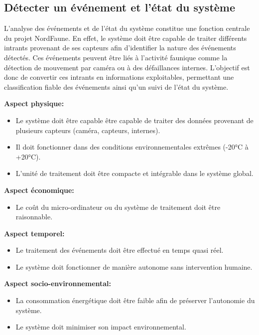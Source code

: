 \subsection{Détecter un événement et l'état du système}
\label{DétecterUnÉnévement}
L’analyse des événements et de l’état du système constitue une fonction centrale du projet NordFaune. En effet, le système doit être capable de traiter différents intrants provenant de ses capteurs afin d’identifier la nature des événements détectés. Ces événements peuvent être liés à l’activité faunique comme la détection de mouvement par caméra ou à des défaillances internes. L’objectif est donc de convertir ces intrants en informations exploitables, permettant une classification fiable des événements ainsi qu’un suivi de l’état du système.
\bigskip

\noindent\textbf{Aspect physique:}
\begin{itemize}
    \item Le système doit être capable être capable de traiter des données provenant de plusieurs capteurs (caméra, capteurs, internes).
    \item Il doit fonctionner dans des conditions environnementales extrêmes (-20°C à +20°C).
    \item L’unité de traitement doit être compacte et intégrable dans le système global.
\end{itemize}

\noindent\textbf{Aspect économique:}
\begin{itemize}
    \item Le coût du micro-ordinateur ou du système de traitement doit être raisonnable.
\end{itemize}

\noindent\textbf{Aspect temporel:}
\begin{itemize}
    \item Le traitement des événements doit être effectué en temps quasi réel.
    \item Le système doit fonctionner de manière autonome sans intervention humaine.
\end{itemize}

\noindent\textbf{Aspect socio-environnemental:}
\begin{itemize}
    \item La consommation énergétique doit être faible afin de préserver l’autonomie du système.
    \item Le système doit minimiser son impact environnemental.
\end{itemize}


